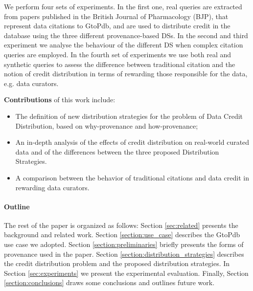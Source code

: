 We perform four sets of experiments. In the first one, real queries are extracted from papers published in the British Journal of Pharmacology (BJP), that represent data citations to GtoPdb, and are used to distribute credit in the database using the three different provenance-based DSs. 
In the second and third experiment we analyse the behaviour of the different DS when complex citation queries are employed.
\textcolor{correction}{In the fourth set of experiments we use both real and synthetic queries to assess the difference between traditional citation and the notion of credit distribution in terms of rewarding those responsible for the data, e.g. data curators.}

\textbf{Contributions}
 of this work include:
\begin{itemize}
    \item The definition of new distribution strategies for the problem of Data Credit Distribution, based on why-provenance and how-provenance;
    \item An in-depth analysis of the effects of credit distribution on real-world curated data and of the differences between the three proposed Distribution Strategies.
    \item \textcolor{correction}{A comparison between the behavior of traditional citations and data credit in rewarding data curators.} %
\end{itemize}

\paragraph{\textbf{Outline}} The rest of the paper is organized as follows:
Section \ref{sec:related} presents the background and related work. Section \ref{section:use_case} describes the GtoPdb use case we adopted. Section \ref{section:preliminaries} briefly presents the forms of provenance used in the paper.  Section \ref{section:distribution_strategies} describes the credit distribution problem and the proposed distribution strategies.  In Section \ref{sec:experiments} we present the experimental evaluation. Finally, Section \ref{section:conclusions} draws some conclusions and outlines future work.



 
